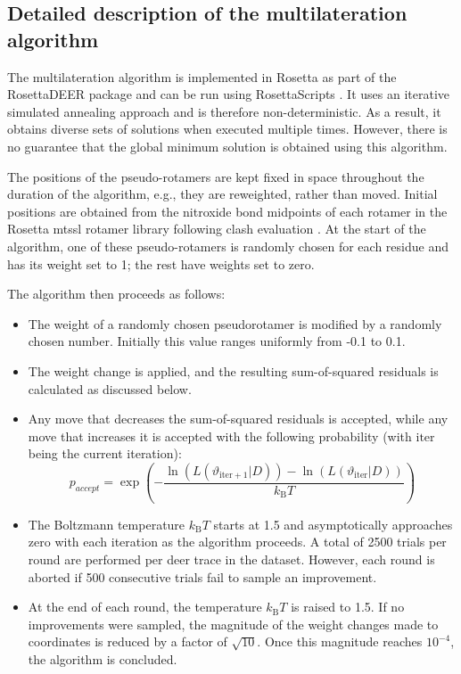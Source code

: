 \subsection{Detailed description of the multilateration algorithm}

The multilateration algorithm is implemented in Rosetta \citep*{Leaver-fay2011, Leman2020} as part of the RosettaDEER package and can be run using RosettaScripts \citep*{Fleishman2011}. It uses an iterative simulated annealing approach and is therefore non-deterministic. As a result, it obtains diverse sets of solutions when executed multiple times. However, there is no guarantee that the global minimum solution is obtained using this algorithm.

The positions of the pseudo-rotamers are kept fixed in space throughout the duration of the algorithm, e.g., they are reweighted, rather than moved. Initial positions are obtained from the nitroxide bond midpoints of each rotamer in the Rosetta \gls{mtssl} rotamer library following clash evaluation \citep*{Alexander2013}. At the start of the algorithm, one of these pseudo-rotamers is randomly chosen for each residue and has its weight set to 1; the rest have weights set to zero.

The algorithm then proceeds as follows:

\begin{itemize}
    \item The weight of a randomly chosen pseudorotamer is modified by a randomly chosen number. Initially this value ranges uniformly from -0.1 to 0.1.
    \item The weight change is applied, and the resulting sum-of-squared residuals is calculated as discussed below.
    \item Any move that decreases the sum-of-squared residuals is accepted, while any move that increases it is accepted with the following probability (with $\mathup{iter}$ being the current iteration):
    \begin{equation}
        p_{accept}= \exp \left( - \frac{\ln \left( L \left( \vartheta_{\mathup{iter+1}} | D \right) \right) - \ln \left( L \left( \vartheta_{\mathup{iter}} | D \right) \right) }{k_{\mathup{B}}T} \right)
        \label{eq:multilateration_accept}
    \end{equation}
    \item The Boltzmann temperature $k_{\mathup{B}}T$ starts at 1.5 and asymptotically approaches zero with each iteration as the algorithm proceeds. A total of 2500 trials per round are performed per \gls{deer} trace in the dataset. However, each round is aborted if 500 consecutive trials fail to sample an improvement.
    \item At the end of each round, the temperature $k_{\mathup{B}}T$ is raised to 1.5. If no improvements were sampled, the magnitude of the weight changes made to coordinates is reduced by a factor of $\sqrt{10}$. Once this magnitude reaches $10^{−4}$, the algorithm is concluded.
\end{itemize}

